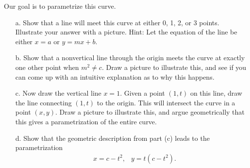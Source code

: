 \documentclass[twoside]{article}
\begin{document}
Our goal is to parametrize this curve.
\begin{itemize}
\item[a.] Show that a line will meet this curve at either 0, 1, 2, or 3 points. Illustrate your answer
with a picture. Hint: Let the equation of the line be either $x = a$ or $y = mx + b$.
\item[b.] Show that a nonvertical line through the origin meets the curve at exactly one other
point when $m^2 \neq c$. Draw a picture to illustrate this, and see if you can come up with
an intuitive explanation as to why this happens.
\item[c.] Now draw the vertical line $x = 1$. Given a point $(1, t)$ on this line, draw the line
connecting $(1, t)$ to the origin. This will intersect the curve in a point $(x, y)$. Draw a
picture to illustrate this, and argue geometrically that this gives a parametrization of
the entire curve.
\item[d.] Show that the geometric description from part (c) leads to the parametrization
\begin{align*}
&x = c − t^2,
&y = t(c − t^2).
\end{align*}
\end{itemize}
\end{document}

